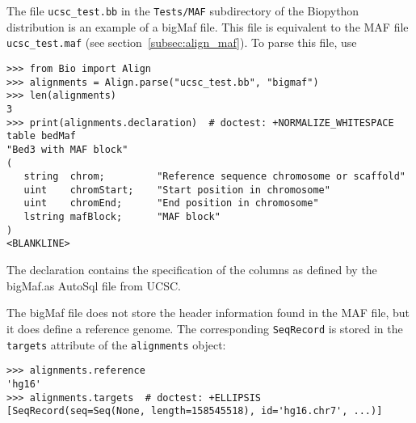 The file \verb|ucsc_test.bb| in the \verb|Tests/MAF| subdirectory of the Biopython distribution is an example of a bigMaf file. This file is equivalent to the MAF file \verb|ucsc_test.maf| (see section~\ref{subsec:align_maf}).
To parse this file, use
\begin{verbatim}
>>> from Bio import Align
>>> alignments = Align.parse("ucsc_test.bb", "bigmaf")
>>> len(alignments)
3
>>> print(alignments.declaration)  # doctest: +NORMALIZE_WHITESPACE
table bedMaf
"Bed3 with MAF block"
(
   string  chrom;         "Reference sequence chromosome or scaffold"
   uint    chromStart;    "Start position in chromosome"
   uint    chromEnd;      "End position in chromosome"
   lstring mafBlock;      "MAF block"
)
<BLANKLINE>
\end{verbatim}
The declaration contains the specification of the columns as defined by the bigMaf.as AutoSql file from UCSC.

The bigMaf file does not store the header information found in the MAF file, but it does define a reference genome. The corresponding \verb|SeqRecord| is stored in the \verb|targets| attribute of the \verb|alignments| object:
\begin{verbatim}
>>> alignments.reference
'hg16'
>>> alignments.targets  # doctest: +ELLIPSIS
[SeqRecord(seq=Seq(None, length=158545518), id='hg16.chr7', ...)]
\end{verbatim}

